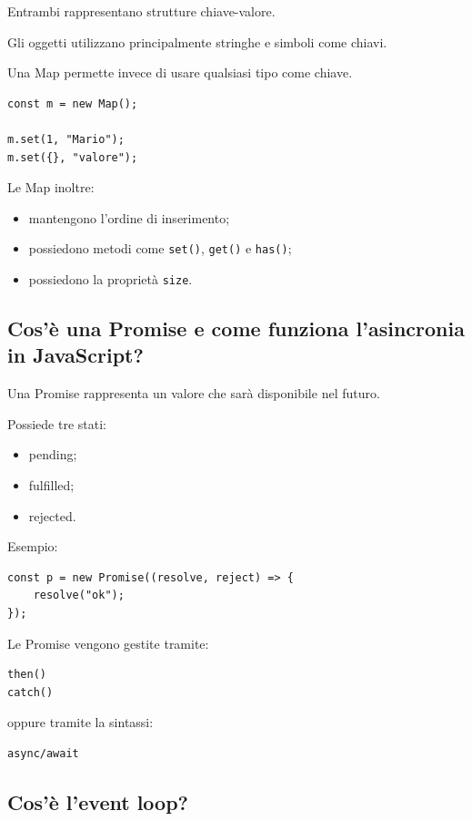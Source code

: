 \documentclass[12pt]{article}
\begin{document}
Entrambi rappresentano strutture chiave-valore.

Gli oggetti utilizzano principalmente stringhe e simboli come chiavi.

Una Map permette invece di usare qualsiasi tipo come chiave.

\begin{verbatim}
const m = new Map();

m.set(1, "Mario");
m.set({}, "valore");
\end{verbatim}

Le Map inoltre:

\begin{itemize}
    \item mantengono l'ordine di inserimento;
    \item possiedono metodi come \texttt{set()}, \texttt{get()} e \texttt{has()};
    \item possiedono la proprietà \texttt{size}.
\end{itemize}


\subsection{Cos'è una Promise e come funziona l'asincronia in JavaScript?}

Una Promise rappresenta un valore che sarà disponibile nel futuro.

Possiede tre stati:

\begin{itemize}
    \item pending;
    \item fulfilled;
    \item rejected.
\end{itemize}

Esempio:

\begin{verbatim}
const p = new Promise((resolve, reject) => {
    resolve("ok");
});
\end{verbatim}

Le Promise vengono gestite tramite:

\begin{verbatim}
then()
catch()
\end{verbatim}

oppure tramite la sintassi:

\begin{verbatim}
async/await
\end{verbatim}


\subsection{Cos'è l'event loop?}
\end{document}
